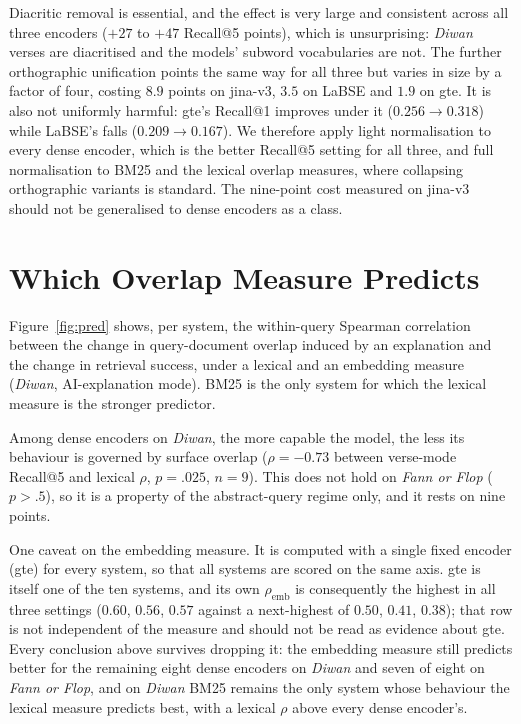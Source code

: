 \documentclass[11pt]{article}
\begin{document}
Diacritic removal is essential, and the effect is very large and consistent across all three encoders ($+27$ to $+47$ Recall@5 points), which is unsurprising: \textit{Diwan} verses are diacritised and the models' subword vocabularies are not. The further orthographic unification points the same way for all three but varies in size by a factor of four, costing $8.9$ points on jina-v3, $3.5$ on LaBSE and $1.9$ on gte. It is also not uniformly harmful: gte's Recall@1 improves under it ($0.256\!\rightarrow\!0.318$) while LaBSE's falls ($0.209\!\rightarrow\!0.167$). We therefore apply light normalisation to every dense encoder, which is the better Recall@5 setting for all three, and full normalisation to BM25 and the lexical overlap measures, where collapsing orthographic variants is standard. The nine-point cost measured on jina-v3 should not be generalised to dense encoders as a class.

\section{Which Overlap Measure Predicts}
\label{app:pred}
Figure~\ref{fig:pred} shows, per system, the within-query Spearman correlation between the change in query-document overlap induced by an explanation and the change in retrieval success, under a lexical and an embedding measure (\textit{Diwan}, AI-explanation mode). BM25 is the only system for which the lexical measure is the stronger predictor.

Among dense encoders on \textit{Diwan}, the more capable the model, the less its behaviour is governed by surface overlap ($\rho=-0.73$ between verse-mode Recall@5 and lexical $\rho$, $p=.025$, $n=9$). This does not hold on \textit{Fann or Flop} ($p>.5$), so it is a property of the abstract-query regime only, and it rests on nine points.

One caveat on the embedding measure. It is computed with a single fixed encoder (gte) for every system, so that all systems are scored on the same axis. gte is itself one of the ten systems, and its own $\rho_{\mathrm{emb}}$ is consequently the highest in all three settings ($0.60$, $0.56$, $0.57$ against a next-highest of $0.50$, $0.41$, $0.38$); that row is not independent of the measure and should not be read as evidence about gte. Every conclusion above survives dropping it: the embedding measure still predicts better for the remaining eight dense encoders on \textit{Diwan} and seven of eight on \textit{Fann or Flop}, and on \textit{Diwan} BM25 remains the only system whose behaviour the lexical measure predicts best, with a lexical $\rho$ above every dense encoder's.
\end{document}
